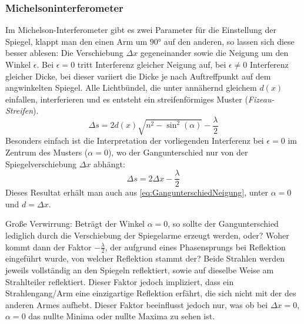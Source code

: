 
\subsubsection{Michelsoninterferometer}
Im Michelson-Interferometer gibt es zwei Parameter für die Einstellung der Spiegel, klappt man den einen Arm um \(\ang{90}\) auf den anderen, so lassen sich diese besser ablesen: Die Verschiebung \(\Delta x\) gegeneinander sowie die Neigung um den Winkel \(\epsilon\). Bei \(\epsilon=0\) tritt Interferenz gleicher Neigung auf, bei \(\epsilon\neq 0\) Interferenz gleicher Dicke, bei dieser variiert die Dicke je nach Auftreffpunkt auf dem angwinkelten Spiegel. Alle Lichtbündel, die unter annähernd gleichem \(d(x)\) einfallen, interferieren und es entsteht ein streifenförmiges Muster (\textit{Fizeau-Streifen}).   
\begin{equation}
    \Delta s=2d(x)\sqrt{n^2-\sin^2(\alpha)}-\frac{\lambda}{2}
    \label{eq:gleichedicke}
\end{equation}
Besonders einfach ist die Interpretation der vorliegenden Interferenz bei \(\epsilon=0\) im Zentrum des Musters (\(\alpha = 0\)), wo der Gangunterschied nur von der Spiegelverschiebung \(\Delta x\) abhängt:
\begin{equation}
    \label{GangunterschiedMI}
    \Delta s = 2 \Delta x - \frac{\lambda}{2}
\end{equation}
Dieses Resultat erhält man auch aus \cref{eq:GangunterschiedNeigung}, unter \(\alpha=0\) und \(d=\Delta x\). 

Große Verwirrung: Beträgt der Winkel \(\alpha=0\), so sollte der Gangunterschied lediglich durch die Verschiebung der Spiegelarme erzeugt werden, oder? Woher kommt dann der Faktor \(-\frac{\lambda}{2}\), der aufgrund eines Phasensprungs bei Reflektion eingeführt wurde, von welcher Reflektion stammt der? Beide Strahlen werden jeweils vollständig an den Spiegeln reflektiert, sowie auf dieselbe Weise am Strahlteiler reflektiert. Dieser Faktor jedoch impliziert, dass ein Strahlengang/Arm eine einzigartige Reflektion erfährt, die sich nicht mit der des anderen Armes aufhebt. 
Dieser Faktor beeinflusst jedoch nur, was ob bei \(\Delta x=0\), \(\alpha=0\) das nullte Minima oder nullte Maxima zu sehen ist.

